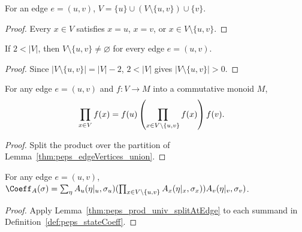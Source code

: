 \begin{lemma}%
    \label{thm:peps_edgeVertices_union}
    \leanok
    For an edge $e=(u,v)$, $V=\{u\}\cup(V\setminus\{u,v\})\cup\{v\}$.
\end{lemma}
\begin{proof}\leanok
    Every $x\in V$ satisfies $x=u$, $x=v$, or $x\in V\setminus\{u,v\}$.
\end{proof}

\begin{lemma}%
    \label{thm:peps_edgeMiddleVertices_nonempty_of_two_lt_card}
    \leanok
    If $2<|V|$, then $V\setminus\{u,v\}\ne\varnothing$ for every edge $e=(u,v)$.
\end{lemma}
\begin{proof}\leanok
    Since $|V\setminus\{u,v\}|=|V|-2$, $2<|V|$ gives $|V\setminus\{u,v\}|>0$.
\end{proof}

\begin{lemma}%
    \label{thm:peps_prod_univ_splitAtEdge}
    \leanok
    For any edge $e=(u,v)$ and $f:V\to M$ into a commutative monoid $M$,
    \begin{align}
        \prod_{x\in V}f(x)
         & =f(u)\left(\prod_{x\in V\setminus\{u,v\}}f(x)\right)f(v).
        \notag
    \end{align}
\end{lemma}
\begin{proof}\leanok
    Split the product over the partition of Lemma~\ref{thm:peps_edgeVertices_union}.
\end{proof}

\begin{lemma}%
    \label{thm:peps_stateCoeff_splitAtEdge}
    \leanok
    For any edge $e=(u,v)$,
    $\Coeff_A(\sigma)=\sum_{\eta}A_u(\eta|_u,\sigma_u)
        (\prod_{x\in V\setminus\{u,v\}}A_x(\eta|_x,\sigma_x))A_v(\eta|_v,\sigma_v)$.
\end{lemma}
\begin{proof}\leanok
    Apply Lemma~\ref{thm:peps_prod_univ_splitAtEdge} to each summand in
    Definition~\ref{def:peps_stateCoeff}.
\end{proof}

